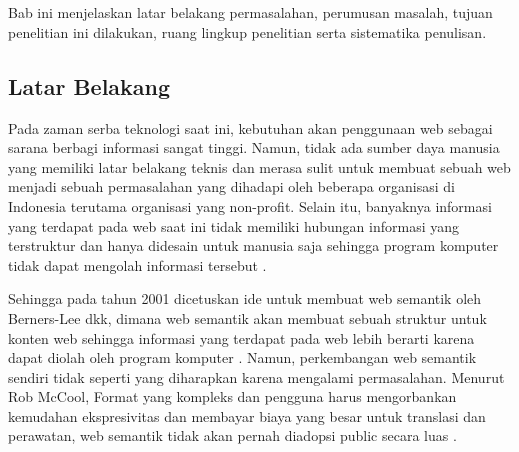 \chapter{\babSatu}

Bab ini menjelaskan latar belakang permasalahan, perumusan masalah, tujuan penelitian ini dilakukan, ruang lingkup penelitian serta sistematika penulisan.

\section{Latar Belakang}

Pada zaman serba teknologi saat ini, kebutuhan akan penggunaan web sebagai sarana berbagi informasi sangat tinggi. Namun, tidak ada sumber daya manusia yang memiliki latar belakang teknis dan merasa sulit untuk membuat sebuah web menjadi sebuah permasalahan yang dihadapi oleh beberapa organisasi di Indonesia terutama organisasi yang non-profit. Selain itu, banyaknya informasi yang terdapat pada web saat ini tidak memiliki hubungan informasi yang terstruktur dan hanya didesain untuk manusia saja sehingga program komputer tidak dapat mengolah informasi tersebut \citep{berners.semantic}.
 
Sehingga pada tahun 2001 dicetuskan ide untuk membuat web semantik oleh Berners-Lee dkk, dimana web semantik akan membuat sebuah struktur untuk konten web sehingga informasi yang terdapat pada web lebih berarti karena dapat diolah oleh program komputer \citep{berners.semantic}. Namun, perkembangan web semantik sendiri tidak seperti yang diharapkan karena mengalami permasalahan. Menurut Rob McCool, Format yang kompleks dan pengguna harus mengorbankan kemudahan ekspresivitas dan membayar biaya yang besar untuk translasi dan perawatan, web semantik tidak akan pernah diadopsi public secara luas \citep{pragmatic.web}.

